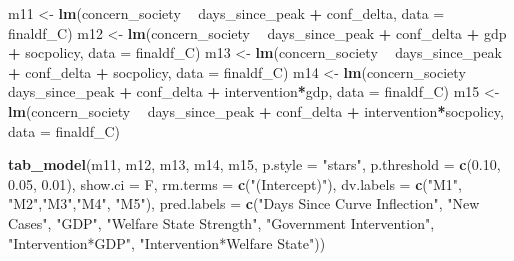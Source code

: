 \documentclass[
]{article}
\newenvironment{Shaded}{\begin{snugshade}}{\end{snugshade}}
\newcommand{\DataTypeTok}[1]{\textcolor[rgb]{0.13,0.29,0.53}{#1}}
\newcommand{\FloatTok}[1]{\textcolor[rgb]{0.00,0.00,0.81}{#1}}
\newcommand{\KeywordTok}[1]{\textcolor[rgb]{0.13,0.29,0.53}{\textbf{#1}}}
\newcommand{\NormalTok}[1]{#1}
\newcommand{\OperatorTok}[1]{\textcolor[rgb]{0.81,0.36,0.00}{\textbf{#1}}}
\newcommand{\StringTok}[1]{\textcolor[rgb]{0.31,0.60,0.02}{#1}}
\begin{document}
\begin{Shaded}
\begin{Highlighting}[]
\NormalTok{m11 <-}\StringTok{ }\KeywordTok{lm}\NormalTok{(concern_society }\OperatorTok{~}\StringTok{ }\NormalTok{days_since_peak }\OperatorTok{+}\StringTok{ }\NormalTok{conf_delta, }\DataTypeTok{data =}\NormalTok{ finaldf_C)}
\NormalTok{m12 <-}\StringTok{ }\KeywordTok{lm}\NormalTok{(concern_society }\OperatorTok{~}\StringTok{ }\NormalTok{days_since_peak }\OperatorTok{+}\StringTok{ }\NormalTok{conf_delta }\OperatorTok{+}\StringTok{ }\NormalTok{gdp }\OperatorTok{+}\StringTok{ }\NormalTok{socpolicy, }\DataTypeTok{data =}\NormalTok{ finaldf_C)}
\NormalTok{m13 <-}\StringTok{ }\KeywordTok{lm}\NormalTok{(concern_society }\OperatorTok{~}\StringTok{ }\NormalTok{days_since_peak }\OperatorTok{+}\StringTok{ }\NormalTok{conf_delta }\OperatorTok{+}\StringTok{ }\NormalTok{socpolicy, }\DataTypeTok{data =}\NormalTok{ finaldf_C)}
\NormalTok{m14 <-}\StringTok{ }\KeywordTok{lm}\NormalTok{(concern_society }\OperatorTok{~}\StringTok{ }\NormalTok{days_since_peak }\OperatorTok{+}\StringTok{ }\NormalTok{conf_delta }\OperatorTok{+}\StringTok{ }\NormalTok{intervention}\OperatorTok{*}\NormalTok{gdp, }\DataTypeTok{data =}\NormalTok{ finaldf_C)}
\NormalTok{m15 <-}\StringTok{ }\KeywordTok{lm}\NormalTok{(concern_society }\OperatorTok{~}\StringTok{ }\NormalTok{days_since_peak }\OperatorTok{+}\StringTok{ }\NormalTok{conf_delta }\OperatorTok{+}\StringTok{ }\NormalTok{intervention}\OperatorTok{*}\NormalTok{socpolicy, }\DataTypeTok{data =}\NormalTok{ finaldf_C)}

\KeywordTok{tab_model}\NormalTok{(m11, m12, m13, m14, m15, }\DataTypeTok{p.style =} \StringTok{"stars"}\NormalTok{, }\DataTypeTok{p.threshold =} \KeywordTok{c}\NormalTok{(}\FloatTok{0.10}\NormalTok{, }\FloatTok{0.05}\NormalTok{, }\FloatTok{0.01}\NormalTok{), }\DataTypeTok{show.ci =}\NormalTok{ F, }\DataTypeTok{rm.terms =} \KeywordTok{c}\NormalTok{(}\StringTok{"(Intercept)"}\NormalTok{),  }\DataTypeTok{dv.labels =} \KeywordTok{c}\NormalTok{(}\StringTok{"M1"}\NormalTok{, }\StringTok{"M2"}\NormalTok{,}\StringTok{"M3"}\NormalTok{,}\StringTok{"M4"}\NormalTok{, }\StringTok{"M5"}\NormalTok{), }\DataTypeTok{pred.labels =} \KeywordTok{c}\NormalTok{(}\StringTok{"Days Since Curve Inflection"}\NormalTok{, }\StringTok{"New Cases"}\NormalTok{,  }\StringTok{"GDP"}\NormalTok{, }\StringTok{"Welfare State Strength"}\NormalTok{, }\StringTok{"Government Intervention"}\NormalTok{, }\StringTok{"Intervention*GDP"}\NormalTok{, }\StringTok{"Intervention*Welfare State"}\NormalTok{))}
\end{Highlighting}
\end{Shaded}
\end{document}
